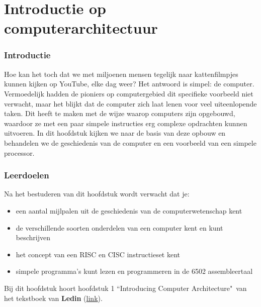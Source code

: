\chapter{Introductie op computerarchitectuur}
\label{chap:comparch}
\subsection*{Introductie}
Hoe kan het toch dat we met miljoenen mensen tegelijk naar kattenfilmpjes kunnen kijken op YouTube, elke dag weer? Het antwoord is simpel: de computer. Vermoedelijk hadden de pioniers op computergebied dit specifieke voorbeeld niet verwacht, maar het blijkt dat de computer zich laat lenen voor veel uiteenlopende taken. Dit heeft te maken met de wijze waarop computers zijn opgebouwd, waardoor ze met een paar simpele instructies erg complexe opdrachten kunnen uitvoeren. In dit hoofdstuk kijken we naar de basis van deze opbouw en behandelen we de geschiedenis van de computer en een voorbeeld van een simpele processor.

\subsection*{Leerdoelen}
Na het bestuderen van dit hoofdstuk wordt verwacht dat je:
\begin{itemize}
    \item[--] een aantal mijlpalen uit de geschiedenis van de computerwetenschap kent
    \item[--] de verschillende soorten onderdelen van een computer kent en kunt beschrijven
    \item[--] het concept van een RISC en CISC instructieset kent
    \item[--] simpele programma's kunt lezen en programmeren in de 6502 assembleertaal
    \newline
\end{itemize}

Bij dit hoofdstuk hoort hoofdstuk 1 ``Introducing Computer Architecture"\ van het tekstboek van \textbf{Ledin} (\href{https://learning.oreilly.com/library/view/modern-computer-architecture/9781803234519/Text/Chapter\_1.xhtml\#:-:text=Introducing\%20Computer\%20Architecture}{link}).


